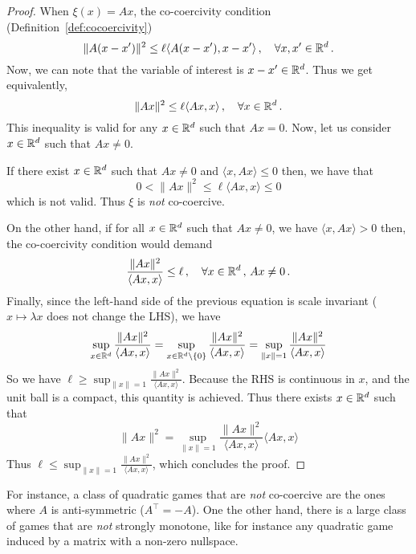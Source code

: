 \documentclass{article}
\begin{document}
\begin{proof}
	When $\xi(x) = Ax$, the co-coercivity condition (Definition~\ref{def:cocoercivity})
	\begin{equation}
	\|A(x-x')\|^2 \leq \ell \langle A(x-x'),x-x'\rangle \,, \quad \forall x,x' \in \mathbb{R}^d\,.
	\end{equation}
	Now, we can note that the variable of interest is $x-x' \in \mathbb{R}^d$. Thus we get equivalently, 
	\begin{equation}
	\|A x\|^2 \leq \ell \langle Ax,x\rangle \,, \quad \forall x \in \mathbb{R}^d\,.
	\end{equation}
	This inequality is valid for any $x \in \mathbb{R}^d$ such that $Ax = 0$. Now, let us consider $x\in \mathbb{R}^d$ such that $Ax \neq 0$. 
	
	If there exist $x \in \mathbb{R}^d$ such that $Ax \neq 0$ and $\langle x,Ax\rangle \leq 0$ then, we have that 
	\begin{equation}
	0 < \|A x\|^2 \leq \ell \langle Ax,x\rangle \leq 0
	\end{equation}
	which is not valid. Thus $\xi$ is \emph{not} co-coercive.
	
	On the other hand, if for all $x \in \mathbb{R}^d$ such that $Ax \neq 0$, we have $\langle x,Ax\rangle > 0$ then, the co-coercivity condition would demand
	\begin{equation}
	\frac{\|A x\|^2}{\langle Ax,x\rangle} \leq \ell \,, \quad \forall x \in \mathbb{R}^d\, ,\,Ax \neq 0\,.
	\end{equation}
	Finally, since the left-hand side of the previous equation is scale invariant ($x\mapsto \lambda x$ does not change the LHS), we have 
	\begin{equation}
	\sup_{x \in \mathbb{R}^d}\frac{\|A x\|^2}{\langle Ax,x\rangle} 
	= \sup_{x \in \mathbb{R}^d\setminus\{0\}}\frac{\|A x\|^2}{\langle Ax,x\rangle}
	=  \sup_{\|x\|=1}\frac{\|A x\|^2}{\langle Ax,x\rangle}
	\end{equation}
	So we have $\ell \geq \sup_{\|x\|=1}\frac{\|A x\|^2}{\langle Ax,x\rangle}$. Because the RHS is continuous in $x$, and the unit ball is a compact, this quantity is achieved. Thus there exists $x \in \mathbb{R}^d$ such that 
	\begin{equation}
	\|A x\|^2 = \sup_{\|x\|=1}\frac{\|A x\|^2}{\langle Ax,x\rangle} \langle Ax,x\rangle 
	\end{equation}
	Thus $\ell \leq \sup_{\|x\|=1}\frac{\|A x\|^2}{\langle Ax,x\rangle}$, which concludes the proof.
\end{proof}
For instance, a class of quadratic games that are \emph{not} co-coercive are the ones where $A$ is anti-symmetric ($A^\top = -A$). One the other hand, there is a large class of games that are \emph{not} strongly monotone, like for instance any quadratic game induced by a matrix with a non-zero nullspace. 
\end{document}
